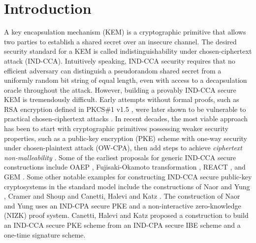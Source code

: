 \documentclass[journal=tches,submission]{iacrtrans}
\begin{document}
\section{Introduction}\label{sec:introduction}
A key encapsulation mechanism (KEM) \cite{DBLP:journals/iacr/Shoup01} is a cryptographic primitive that allows two parties to establish a shared secret over an insecure channel. The desired security standard for a KEM is called indistinguishability under chosen-ciphertext attack (IND-CCA). Intuitively speaking, IND-CCA security requires that no efficient adversary can distinguish a pseudorandom shared secret from a uniformly random bit string of equal length, even with access to a decapsulation oracle throughout the attack. However, building a provably IND-CCA secure KEM is tremendously difficult. Early attempts without formal proofs, such as RSA encryption defined in PKCS\#1 v1.5 \cite{DBLP:journals/rfc/rfc2313}, were later shown to be vulnerable to practical chosen-ciphertext attacks \cite{DBLP:conf/crypto/Bleichenbacher98}. In recent decades, the most viable approach has been to start with cryptographic primitives possessing weaker security properties, such as a public-key encryption (PKE) scheme with one-way security under chosen-plaintext attack (OW-CPA), then add steps to achieve \emph{ciphertext non-malleability} \cite{DBLP:conf/asiacrypt/BellareN00}. Some of the earliest proposals for generic IND-CCA secure constructions include OAEP \cite{DBLP:conf/eurocrypt/BellareR94}, Fujisaki-Okamoto transformation \cite{DBLP:conf/crypto/FujisakiO99}\cite{DBLP:journals/joc/FujisakiO13}, REACT \cite{DBLP:conf/ctrsa/OkamotoP01}, and GEM \cite{DBLP:conf/ctrsa/CoronHJPPT02}. Some other notable examples for constructing IND-CCA secure public-key cryptosystems in the standard model include the constructions of Naor and Yung \cite{naor1990public}, Cramer and Shoup \cite{cramer1998practical} and Canetti, Halevi and Katz \cite{CCA-IBE-EUROCRYPT2004}. The construction of Naor and Yung uses an IND-CPA secure PKE and a non-interactive zero-knowledge (NIZK) proof system. Canetti, Halevi and Katz \cite{CCA-IBE-EUROCRYPT2004} proposed a construction to build an IND-CCA secure PKE scheme from an IND-CPA secure IBE scheme and a one-time signature scheme.
\end{document}

